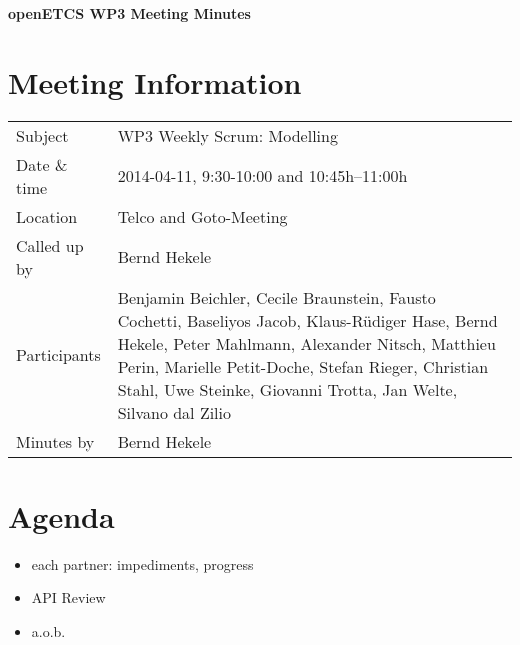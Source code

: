 \documentclass[a4paper, 11pt]{article}
\begin{document}
{\begin{center}\huge\bf openETCS WP3 Meeting Minutes\end{center}}
\section{Meeting Information}

\renewcommand{\arraystretch}{1.5}
\begin{supertabular}{m{.2\textwidth}m{.8\textwidth}}
Subject & WP3 Weekly Scrum: Modelling\\
Date \& time & 2014-04-11, 9:30-10:00 and 10:45h--11:00h\\
Location & Telco and Goto-Meeting\\
Called up by & Bernd Hekele\\
Participants &
Benjamin Beichler,
Cecile Braunstein,
Fausto Cochetti,
Baseliyos Jacob,
Klaus-R\"udiger Hase,
Bernd Hekele,
Peter Mahlmann,
Alexander Nitsch,
Matthieu Perin,
Marielle Petit-Doche,
Stefan Rieger,
Christian Stahl,
Uwe Steinke,
Giovanni Trotta,
Jan Welte,
Silvano dal Zilio
\\

Minutes by & Bernd Hekele\\
\end{supertabular}
\renewcommand{\arraystretch}{1.0}


\section{{Agenda}}
\begin{itemize}
\item each partner: impediments, progress
\item API Review
\item a.o.b.

\end{itemize}
\end{document}
